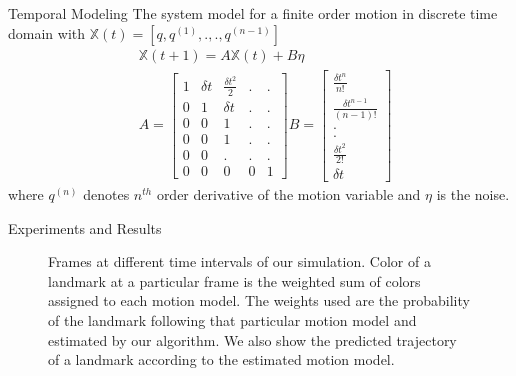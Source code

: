 \documentclass[final]{beamer}
\newlength{\onecolwid}
\begin{document}
\begin{frame}[t]
\begin{columns}[t]
\begin{column}{\onecolwid}
      \begin{block}{Temporal Modeling}
	      The system model for a finite order motion in discrete time domain with $\mathbb{X}(t) = [q,q^{(1)},.,.,q^{(n-1)}]$ \begin{align}
	&\mathbb{X}(t+1) = A \mathbb{X}(t) + B \eta \nonumber\\
	       &A = 
\begin{bmatrix}
 1 & \delta  t & \frac{{\delta  t}^2}{2} &  . & . \\
0 & 1 & \delta  t &  . & . \\
0 & 0 & 1  &  . & . \\
0 & 0 & 1  &  . & . \\
0 & 0 & .  &  . & . \\
0&  0&    0 &     0 &    1
\end{bmatrix}
B = 
\begin{bmatrix}
\frac{{\delta t}^n}{n!}\\
\frac{{\delta t}^{n-1}}{(n-1)!}\\
.\\
.\\
\frac{{\delta t}^2}{2!}\\
\delta t
\end{bmatrix}\label{eq:motion_parameter_prop}
\end{align}
     where $q^{(n)}$ denotes $n^{th}$ order derivative of the motion variable and $\eta$ is the noise.   
      
      \end{block}

      \begin{block}{Experiments and Results}
        \begin{figure}
          \newlength{\imgwidth}
          \setlength{\imgwidth}{\textwidth}
          \centering
          \tikzset{/tikz/x=0.08\linewidth}
          \tikzset{/tikz/y=0.08\linewidth}
          \caption{ Frames at different time intervals of our simulation.
      Color of a landmark at a particular frame is the weighted sum of colors
      assigned to each motion model. The weights used are the probability of the
    landmark following that particular motion model and estimated by our algorithm. We also show the predicted trajectory of a landmark according to the estimated motion model.}
          \label{fig:graphmodel}
        \end{figure}
      \end{block}

      
    \end{column}


\end{columns}
\end{frame}
\end{document}
